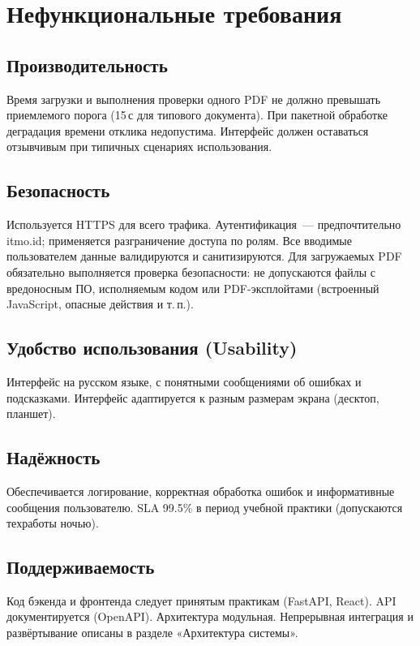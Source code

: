 \section{Нефункциональные требования}

\subsection{Производительность}

Время загрузки и выполнения проверки одного PDF не должно превышать приемлемого порога (15\,с для типового документа). При пакетной обработке деградация времени отклика недопустима. Интерфейс должен оставаться отзывчивым при типичных сценариях использования.

\subsection{Безопасность}

Используется HTTPS для всего трафика. Аутентификация~--- предпочтительно itmo.id; применяется разграничение доступа по ролям. Все вводимые пользователем данные валидируются и санитизируются. Для загружаемых PDF обязательно выполняется проверка безопасности: не допускаются файлы с вредоносным ПО, исполняемым кодом или PDF-эксплойтами (встроенный JavaScript, опасные действия и т.\,п.).

\subsection{Удобство использования (Usability)}

Интерфейс на русском языке, с понятными сообщениями об ошибках и подсказками. Интерфейс адаптируется к разным размерам экрана (десктоп, планшет).

\subsection{Надёжность}

Обеспечивается логирование, корректная обработка ошибок и информативные сообщения пользователю. SLA 99.5\% в период учебной практики (допускаются техработы ночью).

\subsection{Поддерживаемость}

Код бэкенда и фронтенда следует принятым практикам (FastAPI, React). API документируется (OpenAPI). Архитектура модульная. Непрерывная интеграция и развёртывание описаны в разделе «Архитектура системы».

